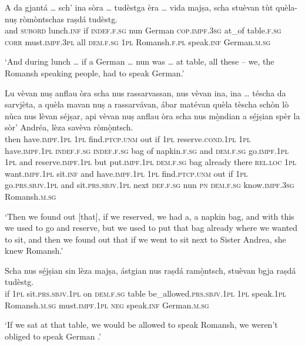 \begin{linenumbers}
\gll    A da gjantá … sch’ ina sòra … tudèstga èra … vida majṣa, scha stuèvan tùt quèla- nuṣ ròmòntschas raṣdá tudèstg.\\
and \textsc{subord} lunch.\textsc{inf} {} if \textsc{indef.f.sg} nun {} German \textsc{cop.impf.3sg} {} at\_of table.\textsc{f.sg} \textsc{corr} must.\textsc{impf.3pl} all \textsc{dem.f.sg} \textsc{1pl} Romansh.\textsc{f.pl} speak.\textsc{inf} German.\textsc{m.sg}\\
\end{linenumbers}
\medskip
\glt `And during lunch … if a German … nun was … at table, all these – we, the Romansh speaking people, had to speak German.'
\medskip

\begin{linenumbers}
\gll    Lu vèvan nuṣ anflau òra scha nus rassarvassan, nus vèvan ina, ina … téscha da sarvjèta, a quèla mavan nuṣ a rassarvávan, ábar matévan quèla tèscha schòn lò nùca nus lèvan séjṣar, api vèvan nuṣ anflau òra scha nus mò̱ndian a sé̱jṣian spèr la sòr’ Andréa, lèza savèva ròmò̱ntsch.\\
then have.\textsc{impf.1pl} \textsc{1pl} find.\textsc{ptcp.unm} out if \textsc{1pl} reserve.\textsc{cond.1pl} \textsc{1pl} have.\textsc{impf.1pl} \textsc{indef.f.sg} \textsc{indef.f.sg} {} bag of napkin.\textsc{f.sg} and \textsc{dem.f.sg} go.\textsc{impf.1pl} \textsc{1pl} and reserve.\textsc{impf.1pl} but put.\textsc{impf.1pl} \textsc{dem.f.sg} bag already there \textsc{rel.loc} \textsc{1pl}  want.\textsc{impf.1pl} sit.\textsc{inf} and have.\textsc{impf.1pl} \textsc{1pl}  find.\textsc{ptcp.unm} out if \textsc{1pl} go.\textsc{prs.sbjv.1pl} and sit.\textsc{prs.sbjv.1pl} next  \textsc{def.f.sg} nun \textsc{pn} \textsc{dem.f.sg} know.\textsc{impf.3sg} Romansh.\textsc{m.sg}\\
\end{linenumbers}
\medskip
\glt `Then we found out [that], if we reserved, we had a, a napkin bag, and with this we used to go and reserve, but we used to put that bag already where we wanted to sit, and then we found out that if we went to sit next to Sister Andrea, she knew Romansh.'
\medskip

\begin{linenumbers}
\gll Scha nus sé̱jṣian sin lèza majṣa, ástgian nus raṣdá ramò̱ntsch, stuèvan bgja raṣdá tudèstg.\\
if \textsc{1pl} sit.\textsc{prs.sbjv.1pl} on \textsc{dem.f.sg} table be\_allowed.\textsc{prs.sbjv.1pl} \textsc{1pl} speak.\textsc{1pl} Romansh.\textsc{m.sg} must.\textsc{impf.1pl} \textsc{neg} speak.\textsc{inf} German.\textsc{m.sg}\\
\end{linenumbers}
\medskip
\glt `If we sat at that table, we would be allowed to speak Romansh, we weren’t obliged to speak German .'
\medskip

